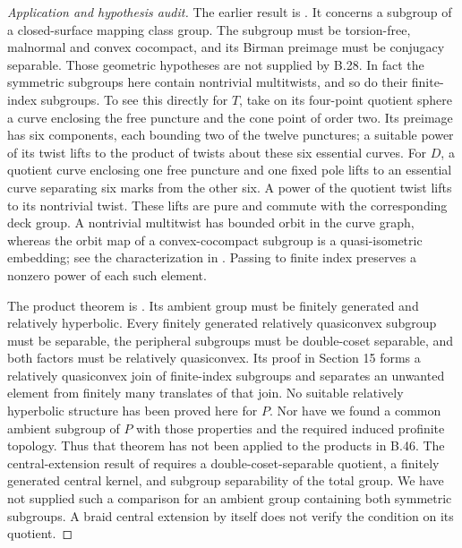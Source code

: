 \begin{proof}[Application and hypothesis audit]
The earlier result is
\citet[Theorem 1.1]{DE_HagenSisto2023}.
It concerns a subgroup of a closed-surface mapping class group.
The subgroup must be torsion-free, malnormal and convex cocompact,
and its Birman preimage must be conjugacy separable.
Those geometric
hypotheses are not supplied by B.28.  In fact the symmetric
subgroups here contain nontrivial multitwists, and so do
their finite-index subgroups.  To see this directly for
$T$, take on its four-point quotient sphere a curve enclosing
the free puncture and the cone point of order two.  Its
preimage has six components, each bounding two of the
twelve punctures; a suitable power of its twist lifts to
the product of twists about these six essential curves.
For $D$, a quotient curve enclosing one free puncture and
one fixed pole lifts to an essential curve separating six
marks from the other six.  A power of the quotient twist
lifts to its nontrivial twist.  These lifts are pure and
commute with the corresponding deck group.  A nontrivial
multitwist has bounded orbit in the curve graph, whereas
the orbit map of a convex-cocompact subgroup is a
quasi-isometric embedding; see the characterization in
\cite[Section 2.1]{DE_HagenSisto2023}.  Passing to finite
index preserves a nonzero power of each such element.

The product theorem is
\cite[Corollary 1.4]{DE_MinasyanMineh2025}.
Its ambient group must be finitely generated and relatively
hyperbolic.  Every finitely generated relatively quasiconvex
subgroup must be separable, the peripheral subgroups must
be double-coset separable, and both factors must be
relatively quasiconvex.
Its proof in Section 15 forms a relatively quasiconvex
join of finite-index subgroups and separates an unwanted
element from finitely many translates of that join.
No suitable relatively hyperbolic structure has been
proved here for $P$.
Nor have we found a common ambient subgroup of $P$
with those properties and the required induced profinite
topology.  Thus that theorem has not been applied to
the products in B.46.
The central-extension result of
\citet[Theorem 1.3]{DE_Mineh2026} requires a
double-coset-separable quotient, a finitely generated
central kernel, and subgroup separability of the total
group.  We have not supplied such a comparison for an
ambient group containing both symmetric subgroups.
A braid central extension by itself does not verify
the condition on its quotient.
\end{proof}


